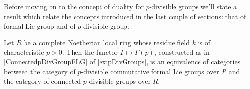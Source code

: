 \documentclass[../Main]{subfiles}
\begin{document}
Before moving on to the concept of duality for $p$-divisible groups
we'll state a result
which relate the concepts introduced in the last couple of sections:
that of formal Lie group and of $p$-divisible group.


\begin{prop}
	Let $R$ be a complete Noetherian local ring whose residue field $k$
	is of characteristic $p > 0$.
	Then the functor $\Gamma \mapsto \Gamma(p)$, constructed as in \cref{ConnectedpDivGroupFLG}
	of \cref{ex:pDivGroups},
	is an equivalence of categories
	between the category of $p$-divisible commutative formal Lie groups over $R$
	and the category of connected $p$-divisible groups over $R$.
\end{prop}



%
%



\end{document}
